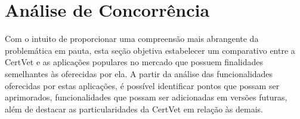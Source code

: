 \documentclass[
    12pt,               %
    openright,          %
    oneside,
    a4paper,            %
    BIBLATEX,           %
    TODO,               %
    english,            %
    brazil              %
    ]{ifsp-spo-inf-ctds}
\begin{document}
    


    \section{Análise de Concorrência} \label{analise_concorrência}

    
    Com o intuito de proporcionar uma compreensão mais abrangente da problemática em pauta, esta seção objetiva estabelecer um comparativo entre a CertVet e as aplicações populares no mercado que possuem finalidades semelhantes às oferecidas por ela. A partir da análise das funcionalidades oferecidas por estas aplicações, é possível identificar pontos que possam ser aprimorados, funcionalidades que possam ser adicionadas em versões futuras, além de destacar as particularidades da CertVet em relação às demais.
\end{document}
